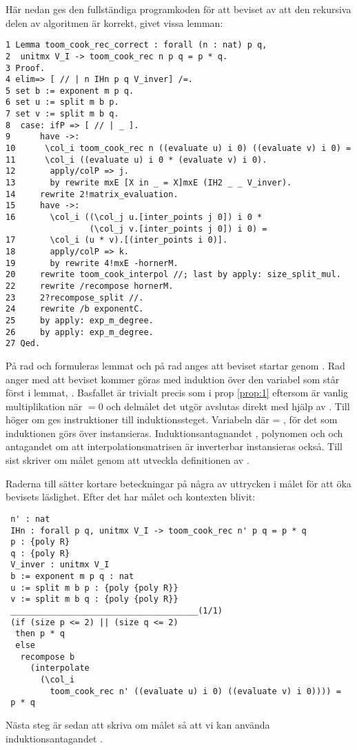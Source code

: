 Här nedan ges den fullständiga programkoden för att beviset av att den
rekursiva delen av algoritmen är korrekt, givet vissa lemman:
\begin{lstlisting}
1 Lemma toom_cook_rec_correct : forall (n : nat) p q,
2  unitmx V_I -> toom_cook_rec n p q = p * q.
3 Proof.
4 elim=> [ // | n IHn p q V_inver] /=.
5 set b := exponent m p q.
6 set u := split m b p.
7 set v := split m b q.
8  case: ifP => [ // | _ ].
9      have ->:
10      \col_i toom_cook_rec n ((evaluate u) i 0) ((evaluate v) i 0) =
11      \col_i ((evaluate u) i 0 * (evaluate v) i 0).
12       apply/colP => j.
13       by rewrite mxE [X in _ = X]mxE (IH2 _ _ V_inver).
14     rewrite 2!matrix_evaluation.
15     have ->:
16       \col_i ((\col_j u.[inter_points j 0]) i 0 *
                 (\col_j v.[inter_points j 0]) i 0) =
17       \col_i (u * v).[(inter_points i 0)].
18       apply/colP => k.
19       by rewrite 4!mxE -hornerM.
20     rewrite toom_cook_interpol //; last by apply: size_split_mul.
22     rewrite /recompose hornerM.
23     2?recompose_split //.
24     rewrite /b exponentC.
25     by apply: exp_m_degree.
26     by apply: exp_m_degree.
27 Qed.
\end{lstlisting}
På rad  och  formuleras lemmat och på rad  anges att beviset
startar genom . Rad  anger med  att beviset kommer
göras med induktion över den variabel som står först i
lemmat, . Basfallet är trivialt precis som i prop \ref{prop:1} eftersom
 är vanlig multiplikation när $=0$ och delmålet det utgör
avslutas direkt med hjälp av \C{//}. Till höger om \C{|} ges instruktioner
till induktionssteget. Variabeln  där   = ,
för det  som induktionen görs över instansieras.
Induktionsantagnandet , polynomen  och  och antagandet
 om att interpolationsmatrisen är inverterbar instansieras
också. Till sist skriver \C{/=} om målet genom att utveckla definitionen
av .

Raderna  till  sätter kortare beteckningar på några av uttrycken
i målet för att öka bevisets läslighet. Efter det har målet och kontexten
blivit:
\begin{lstlisting}
 n' : nat
 IHn : forall p q, unitmx V_I -> toom_cook_rec n' p q = p * q
 p : {poly R}
 q : {poly R}
 V_inver : unitmx V_I
 b := exponent m p q : nat
 u := split m b p : {poly {poly R}}
 v := split m b q : {poly {poly R}}
 ______________________________________(1/1)
 (if (size p <= 2) || (size q <= 2)
  then p * q
  else
   recompose b
     (interpolate
       (\col_i
         toom_cook_rec n' ((evaluate u) i 0) ((evaluate v) i 0)))) =
 p * q
\end{lstlisting}
Nästa steg är sedan att skriva om målet så att vi kan använda
induktionsantagandet .

